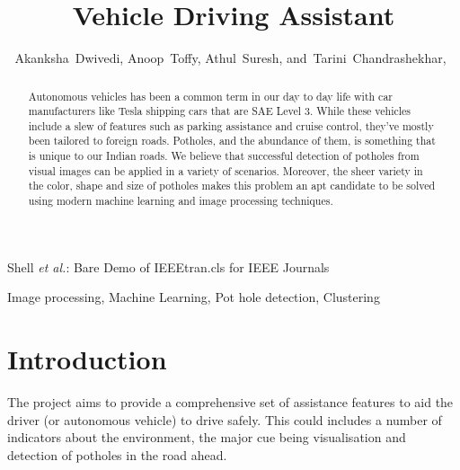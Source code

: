 \documentclass[journal]{IEEEtran}
\begin{document}
\title{Vehicle Driving Assistant}
\author{Akanksha~Dwivedi,
        Anoop~Toffy,
        Athul~Suresh,
        and~Tarini~Chandrashekhar,~}%




%
{Shell \MakeLowercase{\textit{et al.}}: Bare Demo of IEEEtran.cls for IEEE Journals}


\maketitle

\begin{abstract}
Autonomous vehicles has been a common term in our day to day life with
car manufacturers like Tesla shipping cars that are SAE Level 3. While
these vehicles include a slew of features such as parking assistance and cruise
control, they’ve mostly been tailored to foreign roads. Potholes, and the
abundance of them, is something that is unique to our Indian roads. We
believe that successful detection of potholes from visual images can be applied
in a variety of scenarios. Moreover, the sheer variety in the color, shape and
size of potholes makes this problem an apt candidate to be solved using
modern machine learning and image processing techniques.
\end{abstract}

\begin{IEEEkeywords}
Image processing, Machine Learning, Pot hole detection, Clustering
\end{IEEEkeywords}

\IEEEpeerreviewmaketitle



\section{Introduction}
The project aims to provide a comprehensive set of assistance features to aid the driver (or autonomous vehicle) to drive safely. This could includes a number of indicators about the environment, the major cue being visualisation and detection of potholes in the road ahead. 
\end{document}
